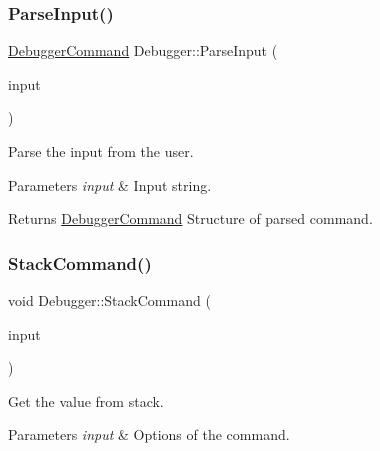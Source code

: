 \subsubsection{\texorpdfstring{Parse\+Input()}{ParseInput()}}
{\footnotesize\ttfamily \mbox{\hyperlink{structDebuggerCommand}{Debugger\+Command}} Debugger\+::\+Parse\+Input (\begin{DoxyParamCaption}\item[{std\+::string}]{input }\end{DoxyParamCaption})\hspace{0.3cm}{\ttfamily [private]}}



Parse the input from the user. 


\begin{DoxyParams}{Parameters}
{\em input} & Input string. \\
\hline
\end{DoxyParams}
\begin{DoxyReturn}{Returns}
\mbox{\hyperlink{structDebuggerCommand}{Debugger\+Command}} Structure of parsed command. 
\end{DoxyReturn}
\mbox{\label{classDebugger_ad97d4a2bee23dd11e8a019caecbd298e}} 
\subsubsection{\texorpdfstring{Stack\+Command()}{StackCommand()}}
{\footnotesize\ttfamily void Debugger\+::\+Stack\+Command (\begin{DoxyParamCaption}\item[{\mbox{\hyperlink{structDebuggerCommand}{Debugger\+Command}}}]{input }\end{DoxyParamCaption})\hspace{0.3cm}{\ttfamily [private]}}



Get the value from stack. 


\begin{DoxyParams}{Parameters}
{\em input} & Options of the command. \\
\hline
\end{DoxyParams}
\mbox{\label{classDebugger_a085572c1d390deeb33240dc36a4b9254}} 
